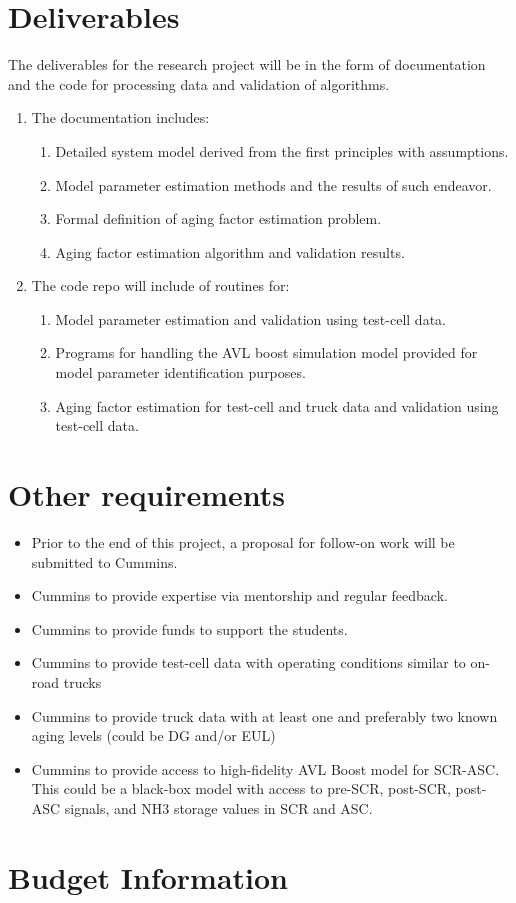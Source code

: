 \documentclass[letterpaper, 11pt]{article}
\begin{document}
\section{Deliverables}
The deliverables for the research project will be in the form of documentation
and the code for processing data and validation of algorithms.

\begin{enumerate}
    \item The documentation includes:
\begin{enumerate}
    \item Detailed system model derived from the first principles with assumptions.
    \item Model parameter estimation methods and the results of such endeavor.
    \item Formal definition of aging factor estimation problem.
    \item Aging factor estimation algorithm and validation results.
\end{enumerate}

\item The code repo will include of routines for:
\begin{enumerate}
    \item Model parameter estimation and validation using test-cell data.
\item Programs for handling the AVL boost simulation model provided for model
parameter identification purposes.
\item Aging factor estimation for test-cell and truck data and validation using
test-cell data.
\end{enumerate}

\end{enumerate}


\section{Other requirements}
\begin{itemize}
    \item Prior to the end of this project, a proposal for follow-on work will be submitted to Cummins.
    \item Cummins to provide expertise via mentorship and regular feedback.
    \item Cummins to provide funds to support the students.
    \item Cummins to provide test-cell data with operating conditions similar to on-road trucks
    \item Cummins to provide truck data with at least one and preferably two known aging levels (could be DG and/or EUL)
    \item Cummins to provide access to high-fidelity AVL Boost model for SCR-ASC. This could be a black-box model with access to pre-SCR, post-SCR, post-ASC signals, and NH3 storage values in SCR and ASC.
\end{itemize}

\section{Budget Information}
\newpage
\nocite{}


\end{document}
